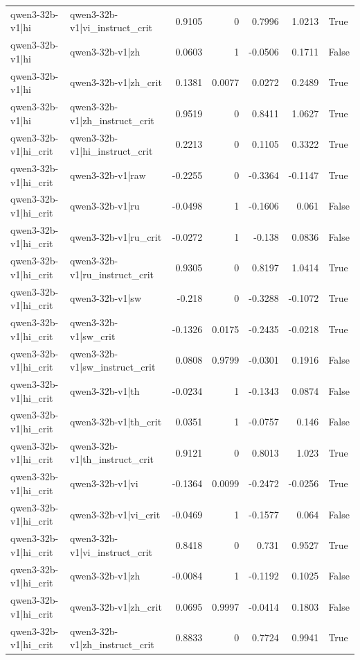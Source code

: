 \begin{table}
\begin{tabular}{l l r r r r l}
qwen3-32b-v1|hi & qwen3-32b-v1|vi_instruct_crit & 0.9105 & 0 & 0.7996 & 1.0213 & True \\
qwen3-32b-v1|hi & qwen3-32b-v1|zh & 0.0603 & 1 & -0.0506 & 0.1711 & False \\
qwen3-32b-v1|hi & qwen3-32b-v1|zh_crit & 0.1381 & 0.0077 & 0.0272 & 0.2489 & True \\
qwen3-32b-v1|hi & qwen3-32b-v1|zh_instruct_crit & 0.9519 & 0 & 0.8411 & 1.0627 & True \\
qwen3-32b-v1|hi_crit & qwen3-32b-v1|hi_instruct_crit & 0.2213 & 0 & 0.1105 & 0.3322 & True \\
qwen3-32b-v1|hi_crit & qwen3-32b-v1|raw & -0.2255 & 0 & -0.3364 & -0.1147 & True \\
qwen3-32b-v1|hi_crit & qwen3-32b-v1|ru & -0.0498 & 1 & -0.1606 & 0.061 & False \\
qwen3-32b-v1|hi_crit & qwen3-32b-v1|ru_crit & -0.0272 & 1 & -0.138 & 0.0836 & False \\
qwen3-32b-v1|hi_crit & qwen3-32b-v1|ru_instruct_crit & 0.9305 & 0 & 0.8197 & 1.0414 & True \\
qwen3-32b-v1|hi_crit & qwen3-32b-v1|sw & -0.218 & 0 & -0.3288 & -0.1072 & True \\
qwen3-32b-v1|hi_crit & qwen3-32b-v1|sw_crit & -0.1326 & 0.0175 & -0.2435 & -0.0218 & True \\
qwen3-32b-v1|hi_crit & qwen3-32b-v1|sw_instruct_crit & 0.0808 & 0.9799 & -0.0301 & 0.1916 & False \\
qwen3-32b-v1|hi_crit & qwen3-32b-v1|th & -0.0234 & 1 & -0.1343 & 0.0874 & False \\
qwen3-32b-v1|hi_crit & qwen3-32b-v1|th_crit & 0.0351 & 1 & -0.0757 & 0.146 & False \\
qwen3-32b-v1|hi_crit & qwen3-32b-v1|th_instruct_crit & 0.9121 & 0 & 0.8013 & 1.023 & True \\
qwen3-32b-v1|hi_crit & qwen3-32b-v1|vi & -0.1364 & 0.0099 & -0.2472 & -0.0256 & True \\
qwen3-32b-v1|hi_crit & qwen3-32b-v1|vi_crit & -0.0469 & 1 & -0.1577 & 0.064 & False \\
qwen3-32b-v1|hi_crit & qwen3-32b-v1|vi_instruct_crit & 0.8418 & 0 & 0.731 & 0.9527 & True \\
qwen3-32b-v1|hi_crit & qwen3-32b-v1|zh & -0.0084 & 1 & -0.1192 & 0.1025 & False \\
qwen3-32b-v1|hi_crit & qwen3-32b-v1|zh_crit & 0.0695 & 0.9997 & -0.0414 & 0.1803 & False \\
qwen3-32b-v1|hi_crit & qwen3-32b-v1|zh_instruct_crit & 0.8833 & 0 & 0.7724 & 0.9941 & True \\

\end{tabular}
\end{table}
